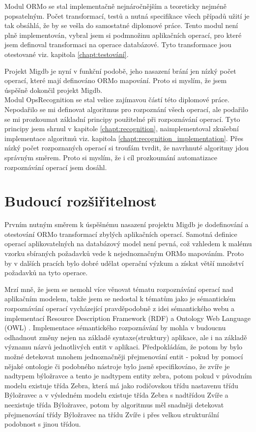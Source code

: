 \documentclass[11pt,twoside,a4paper]{book}
\begin{document}
Modul ORMo se stal implementačně nejnáročnějším a teoreticky nejméně
popsatelným. Počet transformací, testů a nutná specifikace všech případů
užití je tak obsáhlá, že by se vešla do samostatné diplomové práce. Tento modul
není plně implementován, vybral jsem si podmnožinu aplikačních operací, pro
které jsem definoval transformaci na operace databázové. Tyto transformace jsou
otestované viz. kapitola \ref{chapt:testování}.

Projekt Migdb je nyní v funkční podobě, jeho nasazení brání jen nízký
počet operací, které mají definováno ORMo mapování. Proto si myslím, že jsem
úspěšně dokončil projekt Migdb.\\

Modul OpsRecognition se stal velice zajímavou částí této diplomové práce.
Nepodařilo se mi definovat algoritmus pro rozpoznání všech operací, ale podařilo
se mi prozkoumat základní principy použitelné při rozpoznávání operací. Tyto
principy jsem shrnul v kapitole \ref{chapt:recognition},
naimplementoval zkušební implementace algoritmů viz.
kapitola \ref{chapt:recognition_implementation}. Přes nízký počet rozpoznaných
operací si troufám tvrdit, že navrhnuté algoritmy jdou správným směrem. Proto
si myslím, že i cíl prozkoumání automatizace rozpoznávání operací jsem dosáhl.

\section{Budoucí rozšiřitelnost}
Prvním nutným směrem k úspěšnému nasazení projektu Migdb je dodefinování a
otestování ORMo transformací zbylých aplikačních operací. Samotná definice operací
aplikovatelných na databázový model není pevná, což vzhledem k malému vzorku
sbíraných požadavků vede k nejednoznačným ORMo mapováním. Proto by v
dalších pracích bylo dobré udělat operační výzkum a získat větší množství
požadavků na tyto operace.

Mrzí mně, že jsem se nemohl více věnovat tématu rozpoznávání operací nad
aplikačním modelem, takže jsem se nedostal k tématům jako je sémantickém
rozpoznávání operací vycházející pravděpodobně z idei sémantického
webu a implementací Resource Description Framework (RDF) \cite{rdf} a Ontology
Web Language (OWL) \cite{owl}. Implementace sémantického rozpoznávání by mohla v
budoucnu odhadnout změny nejen na základě syntaxe(struktury) aplikace, ale i na
základě významu názvů jednotlivých entit v aplikaci. Předpokládám, že potom by
bylo možné detekovat mnohem jednoznačněji přejmenování entit - pokud by pomocí nějaké
ontologie či podobného nástroje bylo jasně specifikováno, že zvíře je nadtypem
býložravce a tento je nadtypem entity zebra, potom pokud v původním modelu
existuje třída Zebra, která má jako rodičovskou třídu nastavenu třídu
Býložravec a v výsledném modelu existuje třída Zebra s nadtřídou Zvíře a
neexistuje třída Býložravec, potom by algoritmus měl snadněji detekovat
přejmenování třídy Býložravec na třídu Zvíře i přes velkou strukturální
podobnost s jinou třídou.
\end{document}
